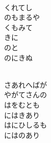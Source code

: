 \documentclass[10pt,b5j]{tarticle} %
\begin{document}
\vspace{1.5em} %
\newcommand{\linespace}{0.5em} %
\newcommand{\blocksize}{0.5\hsize} %
\newcommand{\itemmargin}{3em} %
\begin{enumerate} %
    \setlength{\itemindent}{\itemmargin} %
    \begin{minipage}[c]{\blocksize}
    
        \vspace{\linespace}
        \item~\\
        くれてし\\
        のもまるや\\
        くもみて\\
        きに\\
        のと\\
        のにきぬ
        
    \end{minipage}
    \begin{minipage}[c]{\blocksize}
        
        \vspace{\linespace}
        \item~\\
        さあれへばが\\
        やがてさんの\\
        はをむとも\\
        にはきあり\\
        はにひしるも\\
        にはのあり
        
    \end{minipage}
    \begin{minipage}[c]{\blocksize}
        

\end{minipage}
\end{enumerate}
\end{document}
